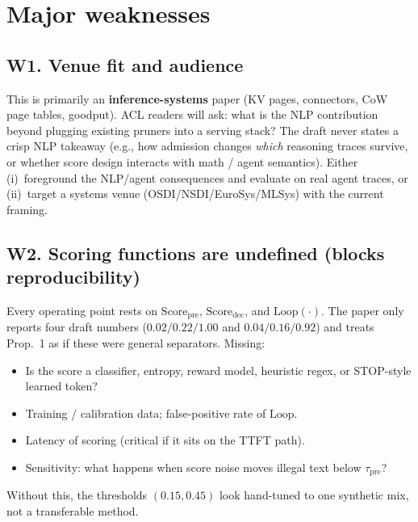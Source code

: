 \documentclass[11pt]{article}
\begin{document}
\section{Major weaknesses}

\subsection{W1. Venue fit and audience}
This is primarily an \textbf{inference-systems} paper (KV pages, connectors,
CoW page tables, goodput). ACL readers will ask: what is the NLP contribution
beyond plugging existing pruners into a serving stack? The draft never states
a crisp NLP takeaway (e.g., how admission changes \emph{which} reasoning
traces survive, or whether score design interacts with math / agent semantics).
Either (i)~foreground the NLP/agent consequences and evaluate on real agent
traces, or (ii)~target a systems venue (OSDI/NSDI/EuroSys/MLSys) with the
current framing.

\subsection{W2. Scoring functions are undefined (blocks reproducibility)}
Every operating point rests on $\mathrm{Score}_{\mathrm{pre}}$,
$\mathrm{Score}_{\mathrm{dec}}$, and $\mathrm{Loop}(\cdot)$.
The paper only reports four draft numbers ($0.02/0.22/1.00$ and $0.04/0.16/0.92$)
and treats Prop.~1 as if these were general separators.
Missing:
\begin{itemize}
  \item Is the score a classifier, entropy, reward model, heuristic regex, or
        STOP-style learned token?
  \item Training / calibration data; false-positive rate of $\mathrm{Loop}$.
  \item Latency of scoring (critical if it sits on the TTFT path).
  \item Sensitivity: what happens when score noise moves illegal text below
        $\tau_{\mathrm{pre}}$?
\end{itemize}
Without this, the thresholds $(0.15,0.45)$ look hand-tuned to one synthetic
mix, not a transferable method.
\end{document}
